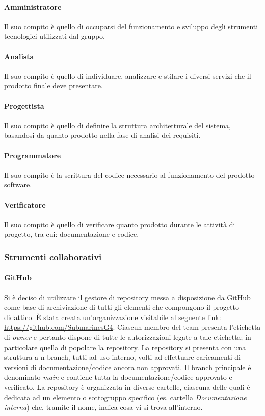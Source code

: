 \paragraph{Amministratore}
Il suo compito è quello di occuparsi del funzionamento e sviluppo degli strumenti tecnologici utilizzati dal gruppo.

\paragraph{Analista}
Il suo compito è quello di individuare, analizzare e stilare i diversi servizi che il prodotto finale deve presentare.

\paragraph{Progettista}
Il suo compito è quello di definire la struttura architetturale del sistema, basandosi da quanto prodotto nella fase di analisi dei requisiti.

\paragraph{Programmatore}
Il suo compito è la scrittura del codice necessario al funzionamento del prodotto software.

\paragraph{Verificatore}
Il suo compito è quello di verificare quanto prodotto durante le attività di progetto, tra cui: documentazione e codice.

\subsubsection{Strumenti collaborativi}
\paragraph{GitHub}
Si è deciso di utilizzare il gestore di repository\glo{} messa a disposizione da GitHub\glo{} come base di
archiviazione di tutti gli elementi che compongono il progetto didattico. È stata creata un’organizzazione visitabile al seguente link: \href{https://github.com/SubmarinesG4}{https://github.com/SubmarinesG4}.
Ciascun membro del team presenta l’etichetta di \textit{owner} e pertanto dispone di tutte le autorizzazioni legate a tale etichetta; in particolare quella di popolare la repository.
La repository si presenta con una struttura a n branch, tutti ad uso interno, volti ad effettuare caricamenti di versioni di documentazione/codice ancora non approvati. Il branch principale è denominato \textit{main} e contiene tutta la documentazione/codice approvato e verificato. 
La repository è organizzata in diverse cartelle, ciascuna delle quali è dedicata ad un elemento o sottogruppo specifico (es. cartella \textit{Documentazione interna}) che, tramite il nome, indica cosa vi si trova all'interno. 

